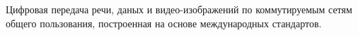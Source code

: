Цифровая передача речи, даных и видео-изображений по 
коммутируемым сетям общего пользования, построенная на 
основе международных стандартов.